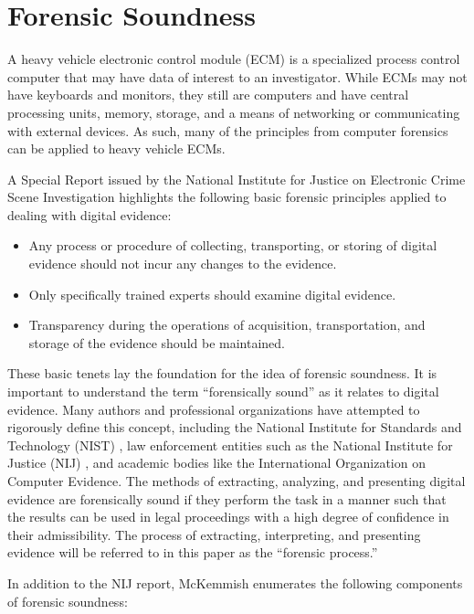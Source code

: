 \documentclass{report}
\begin{document}
\section{Forensic Soundness}

A heavy vehicle electronic control module (ECM) is a specialized process control computer that may have data of interest to an investigator. 
While ECMs may not have keyboards and monitors, they still are computers and have central processing units, memory, storage, and a means of 
networking or communicating with external devices. As such, many of the principles from computer forensics can be applied to heavy vehicle ECMs.

A Special Report issued by the National Institute for Justice on Electronic Crime Scene Investigation \cite{NIJ2008} highlights the following basic forensic 
principles applied to dealing with digital evidence:

\begin{itemize}
\item Any process or procedure of collecting, transporting, or storing of digital evidence should not incur any changes to the evidence.
\item Only specifically trained experts should examine digital evidence.
\item Transparency during the operations of acquisition, transportation, and storage of the evidence should be maintained.
\end{itemize}

These basic tenets lay the foundation for the idea of forensic soundness. It is important to understand the term “forensically sound” 
as it relates to digital evidence. Many authors and professional organizations have attempted to rigorously define this concept, 
including the National Institute for Standards and Technology (NIST) \cite{NIST2001}, law enforcement entities such as the National Institute for 
Justice (NIJ) \cite{NIJ2008}, and academic bodies like the International Organization on Computer Evidence\cite{IOCE2002}. The methods of extracting, analyzing, 
and presenting digital evidence are forensically sound if they perform the task in a manner such that the results can be used in legal 
proceedings with a high degree of confidence in their admissibility. The process of extracting, interpreting, and presenting evidence 
will be referred to in this paper as the “forensic process.”

In addition to the NIJ report, McKemmish \cite{mckemmish2008} enumerates the following components of forensic soundness:
\end{document}
